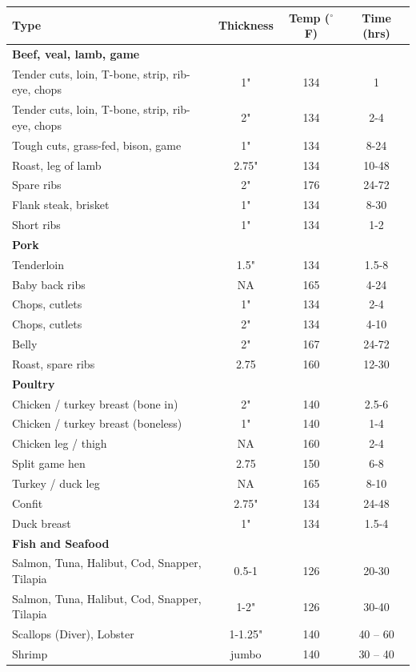 \documentclass{article}
\numberwithin{figure}{section}
\numberwithin{equation}{section}
\begin{document}
	\begin{table}[h]
	\centering
	\begin{tabular}{l c c c}
	\hline
	{\bf Type} & {\bf Thickness} & {\bf Temp ($^{\circ}$F)} & {\bf Time (hrs)}\\
	\hline
	{\bf Beef, veal, lamb, game} & & & \\
	Tender cuts, loin, T-bone, strip, rib-eye, chops & 1" & 134 & 1\\
	Tender cuts, loin, T-bone, strip, rib-eye, chops & 2" & 134 & 2-4\\
	Tough cuts, grass-fed, bison, game & 1" & 134 & 8-24\\
	Roast, leg of lamb & 2.75" & 134 & 10-48\\
	Spare ribs & 2" & 176 & 24-72\\
	Flank steak, brisket & 1" & 134 & 8-30\\
	Short ribs & 1" & 134 & 1-2\\
	\hline
	{\bf Pork} & & & \\
	Tenderloin & 1.5" & 134 & 1.5-8 \\
	Baby back ribs & NA & 165 & 4-24\\
	Chops, cutlets & 1" & 134 & 2-4\\
	Chops, cutlets & 2" & 134 & 4-10\\
	Belly & 2" & 167 & 24-72\\
	Roast, spare ribs & 2.75 & 160 & 12-30\\
	\hline
	{\bf Poultry} & & & \\
	Chicken / turkey breast (bone in) & 2" & 140 & 2.5-6\\
	Chicken / turkey breast (boneless) & 1" & 140 & 1-4\\
	Chicken leg / thigh & NA & 160 & 2-4\\
	Split game hen & 2.75 & 150 & 6-8\\
	Turkey / duck leg & NA & 165 & 8-10\\
	Confit & 2.75" & 134 & 24-48\\
	Duck breast & 1" & 134 & 1.5-4\\
	\hline
	{\bf Fish and Seafood} & & & \\
	Salmon, Tuna, Halibut, Cod, Snapper, Tilapia & 0.5-1 & 126 & 20-30\\
	Salmon, Tuna, Halibut, Cod, Snapper, Tilapia & 1-2" & 126 & 30-40\\
	Scallops (Diver), Lobster & 1-1.25" & 140 & 40 – 60\\
	Shrimp & jumbo	& 140 &30 – 40\\

\end{tabular}
\end{table}
\end{document}
